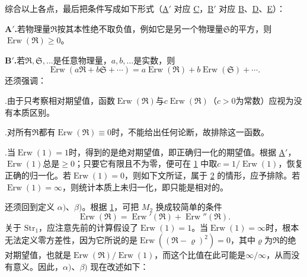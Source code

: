 \documentclass[fontsize=13pt,twoside,openany,headings=normal,parskip=false,bookmarkpackage=false,DIV=calc]{scrbook}
\begin{document}
综合以上各点，最后把条件写成如下形式（\hyperref[cond:IV.Aprime]{A$'$} 对应 \hyperref[cond:IV.1.C]{C}，\hyperref[cond:IV.Bprime]{B$'$} 对应 \hyperref[cond:IV.1.B]{B}、\hyperref[cond:IV.1.D]{D}、\hyperref[cond:IV.1.E]{E}）：

\noindent{}\textbf{A$'$.}\label{cond:IV.Aprime}若物理量$\mathfrak R$按其本性绝不取负值，例如它是另一个物理量$\mathfrak S$的平方，则$\operatorname{Erw}(\mathfrak R)\geq0$。

\noindent{}\textbf{B$'$.}\label{cond:IV.Bprime}若$\mathfrak R,\allowbreak \mathfrak S,\allowbreak \ldots$是任意物理量，$a,\allowbreak b,\allowbreak \ldots$是实数，则
\[
\operatorname{Erw}(a\mathfrak R+b\mathfrak S+\cdots)=a\operatorname{Erw}(\mathfrak R)+b\operatorname{Erw}(\mathfrak S)+\cdots.
\]
还须强调：

\noindent{}.\label{remark:IV.1.1}由于只考察相对期望值，函数$\operatorname{Erw}(\mathfrak R)$与$c\operatorname{Erw}(\mathfrak R)$（$c>0$为常数）应视为没有本质区别。

\noindent{}.\label{remark:IV.1.2}对所有$\mathfrak R$都有$\operatorname{Erw}(\mathfrak R)\equiv0$时，不能给出任何论断，故排除这一函数。

\noindent{}.\label{remark:IV.1.3}当$\operatorname{Erw}(1)=1$时，得到的是绝对期望值，即正确归一化的期望值。根据 \hyperref[cond:IV.Aprime]{A$'$}，$\operatorname{Erw}(1)$总是$\geq0$；只要它有限且不为零，便可在 \hyperref[remark:IV.1.1]{1} 中取$c=1/\operatorname{Erw}(1)$，恢复正确的归一化。若$\operatorname{Erw}(1)=0$，则如下文所证，属于 \hyperref[remark:IV.1.2]{2} 的情形，应予排除。若$\operatorname{Erw}(1)=\infty$，则统计本质上未归一化，即只能是相对的。

还须回到定义 \hyperref[def:IV.1.alpha]{$\alpha)$}、\hyperref[def:IV.1.beta]{$\beta)$}。根据 \hyperref[remark:IV.1.1]{1}，可把 \hyperref[eq:IV.1.M2]{$M_2$} 换成较简单的条件
\begin{equation}\tag{$M_3$}\label{eq:IV.1.M3}
\operatorname{Erw}(\mathfrak R)=\operatorname{Erw}'(\mathfrak R)+\operatorname{Erw}''(\mathfrak R).
\end{equation}
关于 \hyperref[eq:IV.1.Str1]{$\mathrm{Str}_1$}，应注意先前的计算假设了$\operatorname{Erw}(1)=1$。当$\operatorname{Erw}(1)=\infty$时，根本无法定义零方差性，因为它所说的是$\operatorname{Erw}((\mathfrak R-\varrho)^2)=0$，其中$\varrho$为$\mathfrak R$的绝对\hypertarget{origpage-166}{}\label{origpage-166}期望值，也就是$\operatorname{Erw}(\mathfrak R)/\operatorname{Erw}(1)$，而这个比值在此可能是$\infty/\infty$，从而没有意义。因此，\hyperref[def:IV.1.alpha]{$\alpha)$}、\hyperref[def:IV.1.beta]{$\beta)$} 现在改述如下：
\end{document}
